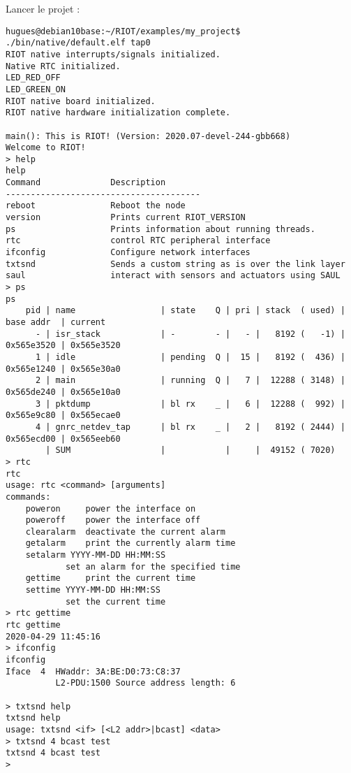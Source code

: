 Lancer le projet :
{\small
\begin{verbatim}
hugues@debian10base:~/RIOT/examples/my_project$ ./bin/native/default.elf tap0
RIOT native interrupts/signals initialized.
Native RTC initialized.
LED_RED_OFF
LED_GREEN_ON
RIOT native board initialized.
RIOT native hardware initialization complete.

main(): This is RIOT! (Version: 2020.07-devel-244-gbb668)
Welcome to RIOT!
> help
help
Command              Description
---------------------------------------
reboot               Reboot the node
version              Prints current RIOT_VERSION
ps                   Prints information about running threads.
rtc                  control RTC peripheral interface
ifconfig             Configure network interfaces
txtsnd               Sends a custom string as is over the link layer
saul                 interact with sensors and actuators using SAUL
> ps
ps
	pid | name                 | state    Q | pri | stack  ( used) | base addr  | current     
	  - | isr_stack            | -        - |   - |   8192 (   -1) | 0x565e3520 | 0x565e3520
	  1 | idle                 | pending  Q |  15 |   8192 (  436) | 0x565e1240 | 0x565e30a0 
	  2 | main                 | running  Q |   7 |  12288 ( 3148) | 0x565de240 | 0x565e10a0 
	  3 | pktdump              | bl rx    _ |   6 |  12288 (  992) | 0x565e9c80 | 0x565ecae0 
	  4 | gnrc_netdev_tap      | bl rx    _ |   2 |   8192 ( 2444) | 0x565ecd00 | 0x565eeb60 
	    | SUM                  |            |     |  49152 ( 7020)
> rtc
rtc
usage: rtc <command> [arguments]
commands:
	poweron		power the interface on
	poweroff	power the interface off
	clearalarm	deactivate the current alarm
	getalarm	print the currently alarm time
	setalarm YYYY-MM-DD HH:MM:SS
			set an alarm for the specified time
	gettime		print the current time
	settime YYYY-MM-DD HH:MM:SS
			set the current time
> rtc gettime
rtc gettime
2020-04-29 11:45:16
> ifconfig
ifconfig
Iface  4  HWaddr: 3A:BE:D0:73:C8:37 
          L2-PDU:1500 Source address length: 6
          
> txtsnd help
txtsnd help
usage: txtsnd <if> [<L2 addr>|bcast] <data>
> txtsnd 4 bcast test    
txtsnd 4 bcast test
> 
\end{verbatim}
}

